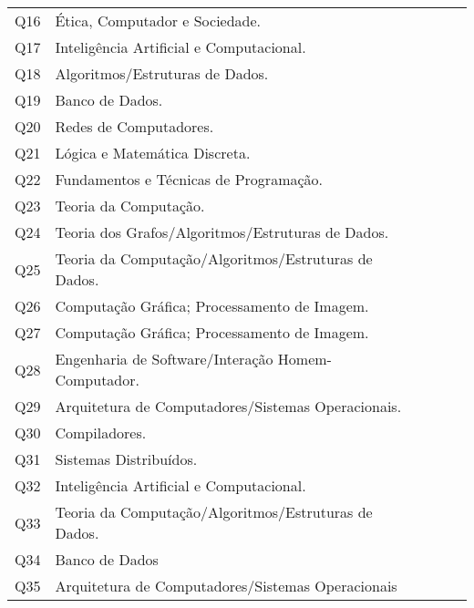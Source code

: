 \documentclass[12pt]{article}
\begin{document}
\begin{table}[]
\begin{tabular}{c|l|c|c|c}
  Q16       & Ética, Computador e Sociedade.                       &             &           &      \\
  Q17       & Inteligência Artificial e Computacional.             &             &           &      \\
  Q18       & Algoritmos/Estruturas de Dados.                      &             &           &       \\
  Q19       & Banco de Dados.                                      &             &           &       \\
  Q20       & Redes de Computadores.                               &             &           &      \\
  Q21       & Lógica e Matemática Discreta.                        &             &           &       \\
  Q22       & Fundamentos e Técnicas de Programação.               &             &           &    \\
  Q23       & Teoria da Computação.                                &             &           &     \\
  Q24       & Teoria dos Grafos/Algoritmos/Estruturas de Dados.    &             &           &     \\
  Q25       & Teoria da Computação/Algoritmos/Estruturas de Dados. &             &           &     \\
  Q26       & Computação Gráfica; Processamento de Imagem.         &             &           &     \\
  Q27       & Computação Gráfica; Processamento de Imagem.         &             &           &    \\
  Q28       & Engenharia de Software/Interação Homem-Computador.   &             &           &    \\
  Q29       & Arquitetura de Computadores/Sistemas Operacionais.   &             &           &     \\
  Q30       & Compiladores.                                        &             &           &   \\
  Q31       & Sistemas Distribuídos.                               &             &           &    \\
  Q32       & Inteligência Artificial e Computacional.             &             &           &    \\
  Q33       & Teoria da Computação/Algoritmos/Estruturas de Dados. &             &           &     \\
  Q34       & Banco de Dados                                       &             &           &     \\
  Q35       & Arquitetura de Computadores/Sistemas Operacionais    &             &           &    \\
\hline\hline
\end{tabular}
\end{table}
\vskip0.3cm
\end{document}
